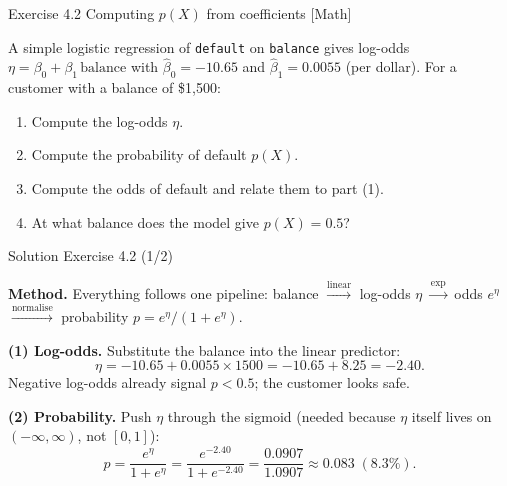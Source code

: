 \documentclass[aspectratio=169,11pt]{beamer}
\begin{document}
\begin{frame}{Exercise 4.2 \textemdash{} Computing $p(X)$ from coefficients [Math]}
\begin{exercise}
A simple logistic regression of \texttt{default} on \texttt{balance}
gives log-odds $\eta = \beta_0 + \beta_1\,\text{balance}$ with
$\hat\beta_0 = -10.65$ and $\hat\beta_1 = 0.0055$ (per dollar).
For a customer with a balance of \$1{,}500:
\begin{enumerate}
  \item Compute the log-odds $\eta$.
  \item Compute the probability of default $p(X)$.
  \item Compute the odds of default and relate them to part (1).
  \item At what balance does the model give $p(X)=0.5$?
\end{enumerate}
\end{exercise}
\end{frame}

\begin{frame}{Solution \textemdash{} Exercise 4.2 (1/2)}
\begin{solutionbox}
\textbf{Method.} Everything follows one pipeline:
balance $\xrightarrow{\text{linear}}$ log-odds $\eta$
$\xrightarrow{\exp}$ odds $e^{\eta}$
$\xrightarrow{\text{normalise}}$ probability
$p=e^{\eta}/(1+e^{\eta})$.

\vspace{1mm}
\textbf{(1) Log-odds.} Substitute the balance into the linear predictor:
\[
  \eta = -10.65 + 0.0055 \times 1500 = -10.65 + 8.25 = -2.40 .
\]
Negative log-odds already signal $p<0.5$; the customer looks safe.

\vspace{1mm}
\textbf{(2) Probability.} Push $\eta$ through the sigmoid
(needed because $\eta$ itself lives on $(-\infty,\infty)$, not $[0,1]$):
\[
  p = \frac{e^{\eta}}{1+e^{\eta}} = \frac{e^{-2.40}}{1+e^{-2.40}}
    = \frac{0.0907}{1.0907} \approx 0.083 \;(8.3\%).
\]
\end{solutionbox}
\end{frame}
\end{document}
